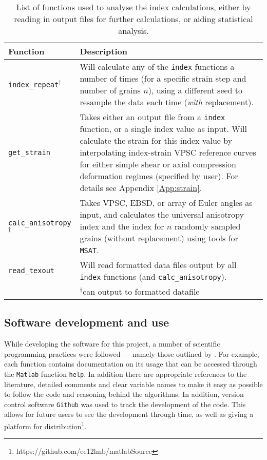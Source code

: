 \documentclass[a4paper,12pt,twoside]{report}
\numberwithin{equation}{chapter}
\begin{document}
\begin{table}[h!] 
	\centering
	\caption[Functions: analysis]{List of functions used to analyse the index calculations, either by reading in output files for further calculations, or aiding statistical analysis.}
	\noindent
	
\begin{tabularx}{\textwidth}{lX}

\hline
\hline
Function    & Description   \\ 
\hline
\hline
\texttt{index\_{}repeat}$^{\dagger}$ & Will calculate any of the \texttt{index} functions a number of times (for a specific strain step and number of grains $n$), using a different seed to resample the data each time (\emph{with} replacement). \\

\texttt{get\_{}strain} & Takes either an output file from a \texttt{index} function, or a single index value as input. Will calculate the strain for this index value by interpolating index-strain VPSC reference curves for either simple shear or axial compression deformation regimes (specified by user). For details see Appendix \ref{App:strain}. \\

\texttt{calc\_{}anisotropy}$^\dagger$ & Takes VPSC, EBSD, or array of Euler angles as input, and calculates the universal anisotropy index and the \cite{Ledbetter2006} index for $n$ randomly sampled grains (without replacement) using tools for \texttt{MSAT}. \\

\texttt{read\_{}texout} & Will read formatted data files output by all \texttt{index} functions (and \texttt{calc\_{}anisotropy}). \\
\hline
{} & $^\dagger$can output to formatted datafile \\
\hline
\hline
\end{tabularx}
\label{tab:analysis_functions}
\end{table}

\subsection{Software development and use}

While developing the software for this project, a number of scientific programming practices were followed --- namely those outlined by \cite{Wilson2014}. For example, each function contains documentation on its usage that can be accessed through the \texttt{Matlab} function \texttt{help}. In addition there are appropriate references to the literature, detailed comments and clear variable names to make it easy as possible to follow the code and reasoning behind the algorithms. In addition, version control software \texttt{Github} was used to track the development of the code. This allows for future users to see the development through time, as well as giving a platform for distribution\footnote{https://github.com/ee12lmb/matlabSource}.
\end{document}
